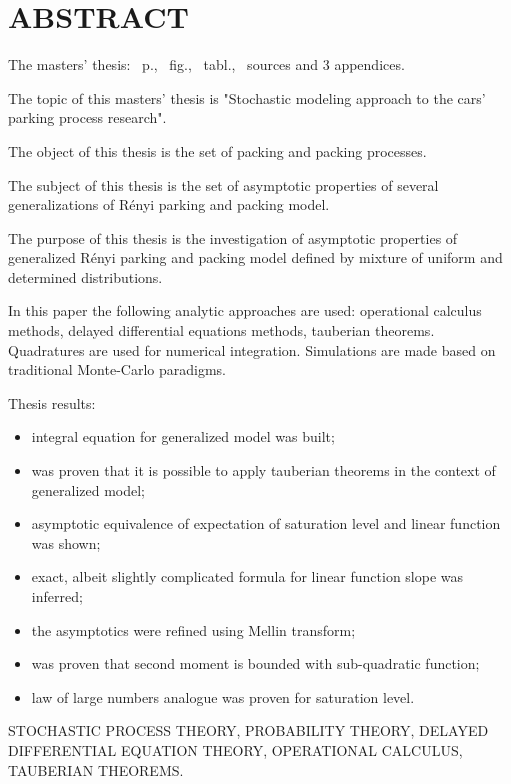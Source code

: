 \chapter*{ABSTRACT}
The masters' thesis: \pageref*{MyLastPage}~p., \totfig~fig., \tottab~tabl., ~sources and 3 appendices.

The topic of this masters' thesis is "Stochastic modeling approach to the cars' parking process research".

The object of this thesis is the set of packing and packing processes.

The subject of this thesis is the set of asymptotic properties of several generalizations of R{\'e}nyi parking and packing model.

The purpose of this thesis is the investigation of asymptotic properties of generalized R{\'e}nyi parking and packing model defined by mixture of uniform and determined distributions. 

In this paper the following analytic approaches are used: operational calculus methods, delayed differential equations methods, tauberian theorems. Quadratures are used for numerical integration. Simulations are made based on traditional Monte-Carlo paradigms.

Thesis results:
\begin{itemize}
	\item integral equation for generalized model was built;
	\item was proven that it is possible to apply tauberian theorems in the context of generalized model;
	\item asymptotic equivalence of expectation of saturation level and linear function was shown;
	\item exact, albeit slightly complicated formula for linear function slope was inferred;
	\item the asymptotics were refined using Mellin transform;
	\item was proven that second moment is bounded with sub-quadratic function;
	\item law of large numbers analogue was proven for saturation level.
\end{itemize}

\MakeUppercase{stochastic process theory, probability theory, delayed differential equation theory, operational calculus, tauberian theorems.}